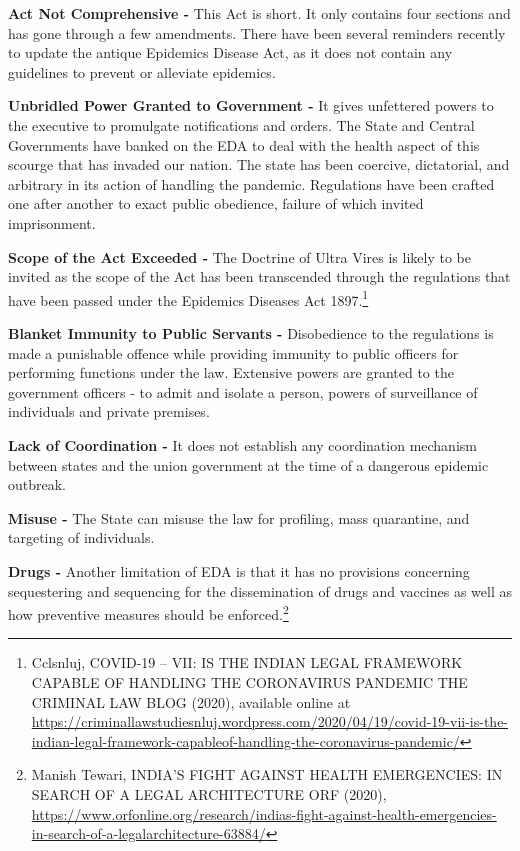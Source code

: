 \begin{multicols}{2}
\noi
\textbf{Act Not Comprehensive -} This Act is short. It only contains four sections and has gone
through a few amendments. There have been several reminders recently to update the antique
Epidemics Disease Act, as it does not contain any guidelines to prevent or alleviate
epidemics.

\noi
\textbf{Unbridled Power Granted to Government -} It gives unfettered powers to the executive to
promulgate notifications and orders. The State and Central Governments have banked on the
EDA to deal with the health aspect of this scourge that has invaded our nation. The state has
been coercive, dictatorial, and arbitrary in its action of handling the pandemic. Regulations
have been crafted one after another to exact public obedience, failure of which invited
imprisonment.

\noi
\textbf{Scope of the Act Exceeded -} The Doctrine of Ultra Vires is likely to be invited as the scope
of the Act has been transcended through the regulations that have been passed under the
Epidemics Diseases Act 1897.\footnote{Cclsnluj, COVID-19 – VII: IS THE INDIAN LEGAL FRAMEWORK CAPABLE OF HANDLING THE CORONAVIRUS PANDEMIC THE CRIMINAL LAW BLOG (2020), available online at \url{https://criminallawstudiesnluj.wordpress.com/2020/04/19/covid-19-vii-is-the-indian-legal-framework-capableof-handling-the-coronavirus-pandemic/}}

\noi
\textbf{Blanket Immunity to Public Servants -} Disobedience to the regulations is made a
punishable offence while providing immunity to public officers for performing functions
under the law. Extensive powers are granted to the government officers - to admit and isolate
a person, powers of surveillance of individuals and private premises.

\noi
\textbf{Lack of Coordination -} It does not establish any coordination mechanism between states and
the union government at the time of a dangerous epidemic outbreak.

\noi
\textbf{Misuse -} The State can misuse the law for profiling, mass quarantine, and targeting of
individuals.

\noi
\textbf{Drugs -} Another limitation of EDA is that it has no provisions concerning sequestering and
sequencing for the dissemination of drugs and vaccines as well as how preventive measures
should be enforced.\footnote{Manish Tewari, INDIA'S FIGHT AGAINST HEALTH EMERGENCIES: IN SEARCH OF A LEGAL ARCHITECTURE ORF (2020), \url{https://www.orfonline.org/research/indias-fight-against-health-emergencies-in-search-of-a-legalarchitecture-63884/}}


\end{multicols}
